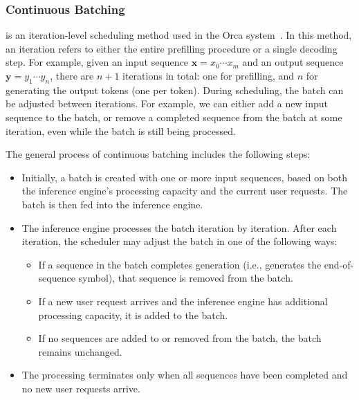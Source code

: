 \subsubsection{Continuous Batching}

 is an iteration-level scheduling method used in the Orca system~\cite{yu-ettal:2022orca}. In this method, an iteration refers to either the entire prefilling procedure or a single decoding step. For example, given an input sequence $\mathbf{x}=x_0\cdots x_m$ and an output sequence $\mathbf{y}=y_1\cdots y_n$, there are $n+1$ iterations in total: one for prefilling, and $n$ for generating the output tokens (one per token).  During scheduling, the batch can be adjusted between iterations. For example, we can either add a new input sequence to the batch, or remove a completed sequence from the batch at some iteration, even while the batch is still being processed.

The general process of continuous batching includes the following steps:

\begin{itemize}
\item \vspace{0.3cm} Initially, a batch is created with one or more input sequences, based on both the inference engine's processing capacity and the current user requests. The batch is then fed into the inference engine.

\item \vspace{0.3em} The inference engine processes the batch iteration by iteration. After each iteration, the scheduler may adjust the batch in one of the following ways:
    \begin{itemize}
    \item \vspace{0.3em} If a sequence in the batch completes generation (i.e., generates the end-of-sequence symbol), that sequence is removed from the batch.
    \item \vspace{0.3em} If a new user request arrives and the inference engine has additional processing capacity, it is added to the batch.
    \item \vspace{0.3em} If no sequences are added to or removed from the batch, the batch remains unchanged.
    \end{itemize}

\item \vspace{0.3em} The processing terminates only when all sequences have been completed and no new user requests arrive.
\end{itemize}

